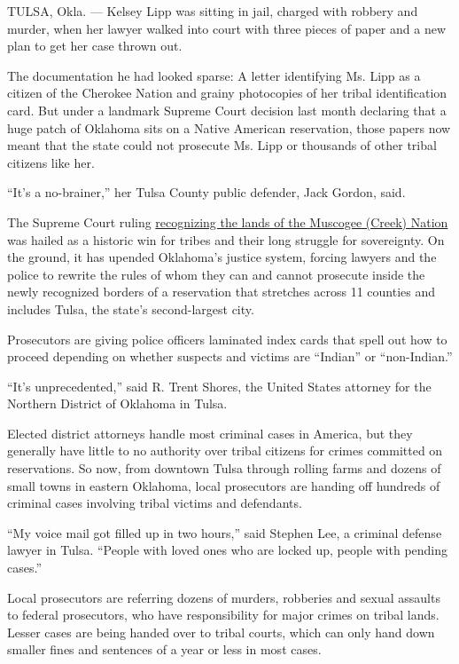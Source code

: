 TULSA, Okla. --- Kelsey Lipp was sitting in jail, charged with robbery
and murder, when her lawyer walked into court with three pieces of paper
and a new plan to get her case thrown out.

The documentation he had looked sparse: A letter identifying Ms. Lipp as
a citizen of the Cherokee Nation and grainy photocopies of her tribal
identification card. But under a landmark Supreme Court decision last
month declaring that a huge patch of Oklahoma sits on a Native American
reservation, those papers now meant that the state could not prosecute
Ms. Lipp or thousands of other tribal citizens like her.

``It's a no-brainer,'' her Tulsa County public defender, Jack Gordon,
said.

The Supreme Court ruling
\href{https://www.nytimes.com/2020/07/09/us/supreme-court-oklahoma-mcgirt-creek-nation.html}{recognizing
the lands of the Muscogee (Creek) Nation} was hailed as a historic win
for tribes and their long struggle for sovereignty. On the ground, it
has upended Oklahoma's justice system, forcing lawyers and the police to
rewrite the rules of whom they can and cannot prosecute inside the newly
recognized borders of a reservation that stretches across 11 counties
and includes Tulsa, the state's second-largest city.

Prosecutors are giving police officers laminated index cards that spell
out how to proceed depending on whether suspects and victims are
``Indian'' or ``non-Indian.''

``It's unprecedented,'' said R. Trent Shores, the United States attorney
for the Northern District of Oklahoma in Tulsa.

Elected district attorneys handle most criminal cases in America, but
they generally have little to no authority over tribal citizens for
crimes committed on reservations. So now, from downtown Tulsa through
rolling farms and dozens of small towns in eastern Oklahoma, local
prosecutors are handing off hundreds of criminal cases involving tribal
victims and defendants.

``My voice mail got filled up in two hours,'' said Stephen Lee, a
criminal defense lawyer in Tulsa. ``People with loved ones who are
locked up, people with pending cases.''

Local prosecutors are referring dozens of murders, robberies and sexual
assaults to federal prosecutors, who have responsibility for major
crimes on tribal lands. Lesser cases are being handed over to tribal
courts, which can only hand down smaller fines and sentences of a year
or less in most cases.


